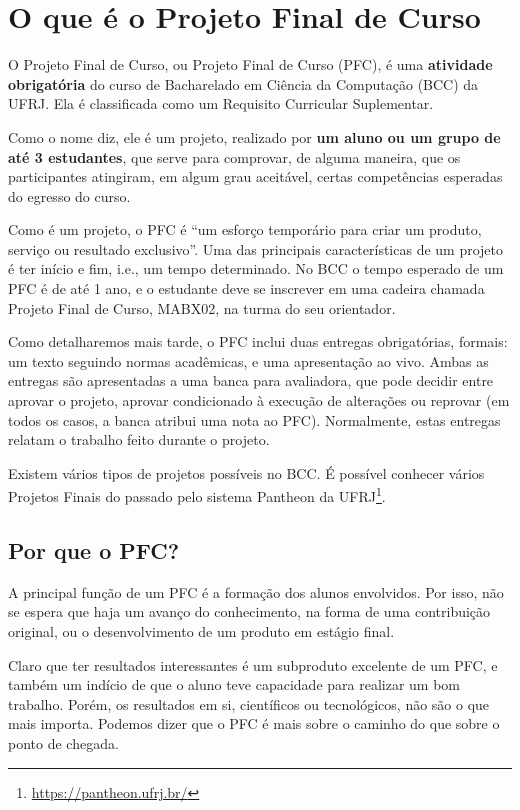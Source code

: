 \chapter{O que é o Projeto Final de Curso}

O Projeto Final de Curso, ou Projeto Final de Curso (PFC), é uma \textbf{atividade obrigatória} do curso de Bacharelado em Ciência da Computação (BCC) da UFRJ. Ela é classificada como um Requisito Curricular Suplementar.

Como o nome diz, ele é um projeto, realizado por \textbf{um aluno ou um grupo de até 3 estudantes}, que serve para comprovar, de alguma maneira, que os participantes atingiram, em algum grau aceitável, certas competências esperadas do egresso do curso.

Como é um projeto, o PFC é ``um esforço temporário para criar um produto, serviço ou resultado exclusivo''\citep{pmbok}. Uma das principais características de um projeto é ter início e fim, i.e., um tempo determinado. No BCC o tempo esperado de um PFC é de até 1 ano, e o estudante deve se inscrever em uma cadeira chamada Projeto Final de Curso, MABX02, na turma do seu orientador.

Como detalharemos mais tarde, o PFC inclui duas entregas obrigatórias, formais: um texto seguindo normas acadêmicas, e uma apresentação ao vivo. Ambas as entregas são apresentadas a uma banca para avaliadora, que pode decidir entre aprovar o projeto, aprovar condicionado à execução de alterações ou reprovar (em todos os casos, a banca atribui uma nota ao PFC). Normalmente, estas entregas relatam o trabalho feito durante o projeto.

Existem vários tipos de projetos possíveis no BCC. É possível conhecer vários Projetos Finais do passado pelo sistema Pantheon da UFRJ\footnote{\url{https://pantheon.ufrj.br/}}.

\section{Por que o PFC?}

A principal função de um PFC é a formação dos alunos envolvidos. Por isso, não se espera que haja um avanço do conhecimento, na forma de uma contribuição original, ou o desenvolvimento de um produto em estágio final.

Claro que ter resultados interessantes é um subproduto excelente de um PFC, e também um indício de que o aluno teve capacidade para realizar um bom trabalho. Porém, os resultados em si, científicos ou tecnológicos, não são o que mais importa. Podemos dizer que o PFC é mais sobre o caminho do que sobre o ponto de chegada.


